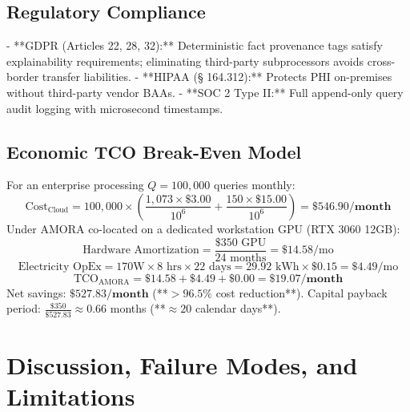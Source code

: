\documentclass[journal,10pt,twocolumn]{IEEEtran}
\begin{document}
\subsection{Regulatory Compliance}
- **GDPR (Articles 22, 28, 32):** Deterministic fact provenance tags satisfy explainability requirements; eliminating third-party subprocessors avoids cross-border transfer liabilities.  
- **HIPAA (§ 164.312):** Protects PHI on-premises without third-party vendor BAAs.  
- **SOC 2 Type II:** Full append-only query audit logging with microsecond timestamps.

\subsection{Economic TCO Break-Even Model}
For an enterprise processing $Q = 100,000$ queries monthly:
\begin{equation}
    \text{Cost}_{\text{Cloud}} = 100{,}000 \times \left( \frac{1{,}073 \times \$3.00}{10^6} + \frac{150 \times \$15.00}{10^6} \right) = \mathbf{\$546.90 / \text{month}}
\end{equation}
Under AMORA co-located on a dedicated workstation GPU (RTX 3060 12GB):
\begin{equation}
    \text{Hardware Amortization} = \frac{\$350 \text{ GPU}}{24 \text{ months}} = \$14.58 / \text{mo}
\end{equation}
\begin{equation}
    \text{Electricity OpEx} = 170\text{W} \times 8\text{ hrs} \times 22\text{ days} = 29.92\text{ kWh} \times \$0.15 = \$4.49 / \text{mo}
\end{equation}
\begin{equation}
    \text{TCO}_{\text{AMORA}} = \$14.58 + \$4.49 + \$0.00 = \mathbf{\$19.07 / \text{month}}
\end{equation}
Net savings: $\mathbf{\$527.83 / \text{month}}$ (**$>96.5\%$ cost reduction**). Capital payback period: $\frac{\$350}{\$527.83} \approx 0.66$ months (**$\approx 20$ calendar days**).

\section{Discussion, Failure Modes, and Limitations}
\label{sec:limitations}
\end{document}
